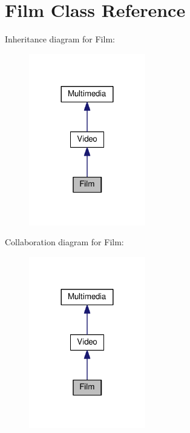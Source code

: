 \hypertarget{classFilm}{\section{Film Class Reference}
\label{classFilm}
}


Inheritance diagram for Film\+:
\nopagebreak
\begin{figure}[H]
\begin{center}
\leavevmode
\includegraphics[width=144pt]{classFilm__inherit__graph}
\end{center}
\end{figure}


Collaboration diagram for Film\+:
\nopagebreak
\begin{figure}[H]
\begin{center}
\leavevmode
\includegraphics[width=144pt]{classFilm__coll__graph}
\end{center}
\end{figure}
